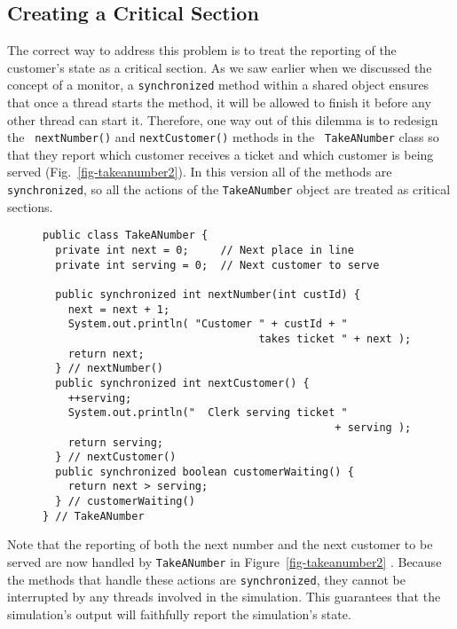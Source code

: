 \subsection*{Creating a Critical Section}
\noindent The correct way to address this problem is to treat the reporting of
the customer's state as a critical section.  As we saw earlier when we
discussed the concept of a monitor, a {\tt synchronized} method within
a shared object ensures that once a thread starts the method, it will
be allowed to finish it before any other thread can start
it.  Therefore, one way out of this dilemma is to redesign the {\tt
nextNumber()} and {\tt nextCustomer()} methods in the {\tt
TakeANumber} class so that they report which customer receives a
ticket and which customer is being served
(Fig.~\ref{fig-takeanumber2}).  In this version all of the methods are
{\tt synchronized}, so all the actions of the {\tt TakeANumber} object
are treated as critical sections.

\begin{figure}[h!]
\jjjprogstart
\begin{jjjlisting}
\begin{lstlisting}
public class TakeANumber {
  private int next = 0;     // Next place in line
  private int serving = 0;  // Next customer to serve

  public synchronized int nextNumber(int custId) {
    next = next + 1;
    System.out.println( "Customer " + custId + "
                                  takes ticket " + next );
    return next;
  } // nextNumber()
  public synchronized int nextCustomer() {
    ++serving;
    System.out.println("  Clerk serving ticket " 
                                              + serving );
    return serving;
  } // nextCustomer()
  public synchronized boolean customerWaiting() {
    return next > serving;
  } // customerWaiting()
} // TakeANumber
\end{lstlisting}
\end{jjjlisting}
\end{figure}


Note that the reporting of both the
next number and the next customer to be served are now handled by
{\tt TakeANumber} in Figure~\ref{fig-takeanumber2} . Because the methods that handle these actions are
{\tt synchronized}, they cannot be interrupted by any threads involved in
the simulation.  This guarantees that the simulation's output will
faithfully report the simulation's state.

